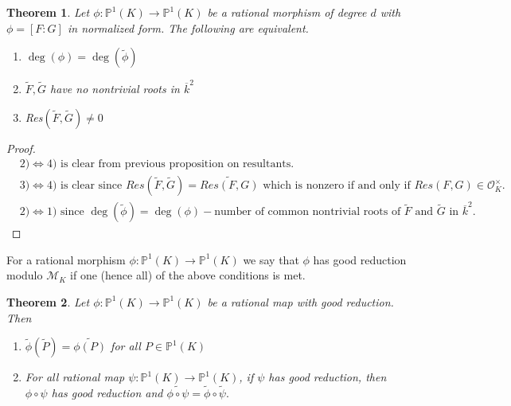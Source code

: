 \documentclass{amsart}
\newtheorem{thm}{Theorem}[section]
\renewcommand{\P}{\mathbb{P}}
\newcommand{\MCM}{\mathcal{M}}
\newcommand{\MCO}{\mathcal{O}}
\begin{document}
\begin{thm}
Let $\phi: \mathbb{P}^1(K) \rightarrow \mathbb{P}^1(K)$ be a rational morphism of degree $d$ with $\phi=[F:G]$ in normalized form. 
The following are equivalent. 

\begin{enumerate}
\item $\deg(\phi)=\deg(\tilde{\phi})$
\item $\tilde{F}, \tilde{G}$ have no nontrivial roots in $\overline{k}^2$
\item Res$(\tilde{F},\tilde{G}) \neq 0$
\end{enumerate}


\end{thm}

\begin{proof}

\begin{align*}
& 2)\iff 4) \text{ is clear from previous proposition on resultants.} \\
& 3)\iff 4) \text{ is clear since } Res(\tilde{F}, \tilde{G})=\widetilde{Res(F,G)} \text{ which is nonzero if and only if } Res(F,G) \in \MCO_K^{\times}. \\
& 2)\iff 1) \text{ since } \deg(\tilde{\phi})=\deg(\phi) - \text{number of common nontrivial roots of }\tilde{F}\text{ and }\tilde{G}\text{ in } \overline{k}^2. 
\end{align*}

\end{proof}

For a rational morphism $\phi: \mathbb{P}^1(K) \rightarrow \mathbb{P}^1(K) $ we say that $\phi$ has good reduction modulo $\MCM_K$ if one (hence all) of the above conditions is met. 

\begin{thm}
Let $\phi:\mathbb{P}^1(K) \rightarrow \mathbb{P}^1(K) $ be a rational map with good reduction.  Then 
\begin{enumerate}
\item $\tilde{\phi}(\tilde{P})=\widetilde{\phi(P)}$ for all $P \in \P^1(K) $
\item For all rational map $\psi: \mathbb{P}^1(K)  \rightarrow \mathbb{P}^1(K) $, if $\psi$ has good reduction, then $\phi \circ \psi$ has good reduction and $\widetilde{\phi \circ \psi} = \tilde{\phi} \circ \tilde{\psi}. $
 
\end{enumerate}
\end{thm}
\end{document}
